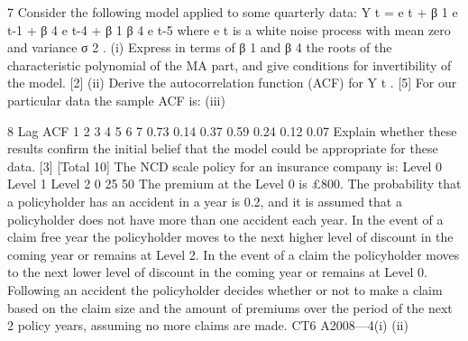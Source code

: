 \documentclass[a4paper,12pt]{article}
\begin{document}
7
Consider the following model applied to some quarterly data:
Y t = e t + β 1 e t-1 + β 4 e t-4 + β 1 β 4 e t-5
where e t is a white noise process with mean zero and variance σ 2 .
(i) Express in terms of β 1 and β 4 the roots of the characteristic polynomial of the
MA part, and give conditions for invertibility of the model.
[2]
(ii) Derive the autocorrelation function (ACF) for Y t .
[5]
For our particular data the sample ACF is:
(iii)


8
Lag ACF
1
2
3
4
5
6
7 0.73
0.14
0.37
0.59
0.24
0.12
0.07
Explain whether these results confirm the initial belief that the model could be
appropriate for these data.
[3]
[Total 10]
The NCD scale policy for an insurance company is:
Level 0
Level 1
Level 2
0%
25%
50%
The premium at the Level 0 is £800. The probability that a policyholder has an
accident in a year is 0.2, and it is assumed that a policyholder does not have more than one accident each year.
In the event of a claim free year the policyholder moves to the next higher level of discount in the coming year or remains at Level 2.
In the event of a claim the policyholder moves to the next lower level of discount in the coming year or remains at Level 0.
Following an accident the policyholder decides whether or not to make a claim based on the claim size and the amount of premiums over the period of the next 2 policy
years, assuming no more claims are made.
CT6 A2008—4(i)
(ii)
\end{document}
